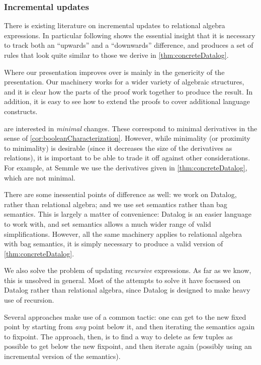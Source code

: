 \subsubsection{Incremental updates}

There is existing literature on incremental updates to relational algebra
expressions. In particular \textcite{griffin1997improved} following
\textcite{qian1991incremental} shows the essential insight that it is necessary to
track both an ``upwards'' and a ``downwards'' difference, and produces a set of
rules that look quite similar to those we derive in \cref{thm:concreteDatalog}.

Where our presentation improves over \citeauthor{griffin1997improved} is mainly in
the genericity of the presentation. Our machinery works for a wider variety of
algebraic structures, and it is clear how the parts of the proof work together
to produce the result. In addition, it is easy to see how to extend the proofs
to cover additional language constructs.

\citeauthor{griffin1997improved} are interested in \emph{minimal} changes. These correspond to
minimal derivatives in the sense of \cref{cor:booleanCharacterization}. However,
while minimality (or proximity to minimality) is desirable (since it decreases
the size of the derivatives as relations), it is important to be able to trade
it off against other considerations. For example, at
Semmle we use the derivatives given in \cref{thm:concreteDatalog}, which are not minimal.

There are some inessential points of difference as well: we work on Datalog,
rather than relational algebra; and we use set semantics rather than bag
semantics. This is largely a matter of convenience: Datalog is an easier
language to work with, and set semantics allows a much wider range of valid
simplifications. However, all the same machinery applies to relational algebra
with bag semantics, it is simply necessary to produce a valid version of \cref{thm:concreteDatalog}.

We also solve the problem of updating \emph{recursive} expressions. As far as we
know, this is unsolved in general. Most of the attempts to solve it have
focussed on Datalog rather than relational algebra, since Datalog is designed to
make heavy use of recursion.

Several approaches
\autocites{gupta1993maintaining}{harrison1992maintenance}
make use of a common tactic: one can get to the new fixed
point by starting from \emph{any} point below it, and then iterating the
semantics again to fixpoint. The approach, then, is to find a way to delete as
few tuples as possible to get below the new fixpoint, and then iterate again
(possibly using an incremental version of the semantics).

